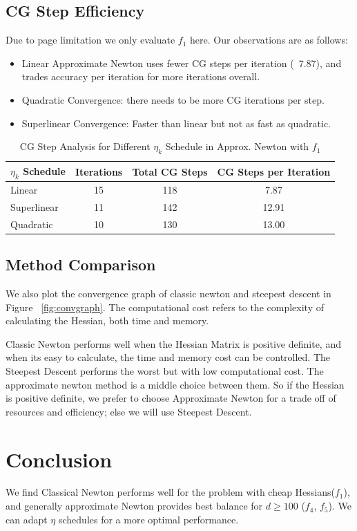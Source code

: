\documentclass[12pt]{article}
\begin{document}
\subsection{CG Step Efficiency}
Due to page limitation we only evaluate $f_1$ here. Our observations are as follows:

\begin{itemize}
    \item Linear Approximate Newton uses fewer CG steps per iteration (~7.87), and trades accuracy per iteration for more iterations overall.
    \item Quadratic Convergence: there needs to be more CG iterations per step.
    \item Superlinear Convergence: Faster than linear but not as fast as quadratic.
\end{itemize}


\begin{table}[h]
    \centering
    \begin{tabular}{lccc}
        \toprule
        \textbf{$\eta_k$ Schedule} & \textbf{Iterations} & \textbf{Total CG Steps} & \textbf{CG Steps per Iteration} \\
        \midrule
        Linear & 15 & 118 & 7.87 \\
        Superlinear & 11 & 142 & 12.91 \\
        Quadratic & 10 & 130 & 13.00 \\
        \bottomrule
    \end{tabular}
    \caption{CG Step Analysis for Different $\eta_k$ Schedule in Approx. Newton with $f_1$}
    \label{tab:cg_steps}
\end{table}

\subsection{Method Comparison}
We also plot the convergence graph of classic newton and steepest descent in Figure ~\ref{fig:convgraph}. The computational cost refers to the complexity of calculating the Hessian, both time and memory.

Classic Newton performs well when the Hessian Matrix is positive definite, and when its easy to calculate, the time and memory cost can be controlled. The Steepest Descent performs the worst but with low computational cost. The approximate newton method is a middle choice between them. So if the Hessian is positive definite, we prefer to choose Approximate Newton for a trade off of resources and efficiency; else we will use Steepest Descent.

\section{Conclusion}

We find Classical Newton performs well for the problem with cheap Hessians($f_1$), and generally approximate Newton provides best balance for $d \geq 100$ ($f_4$, $f_5$). We can adapt $\eta$ schedules for a more optimal performance.
\end{document}
